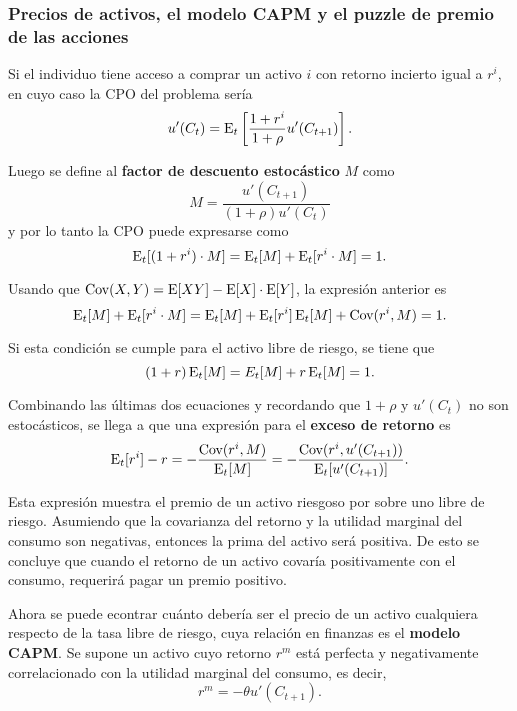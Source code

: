 \documentclass[DeGregorioResumen]{subfiles}
\begin{document}
\subsubsection{Precios de activos, el modelo CAPM y el puzzle de premio de las acciones}

Si el individuo tiene acceso a comprar un activo $i$ con retorno incierto igual a $r^i$, en cuyo caso la CPO del problema sería
\begin{equation*}
u'(C_t)= \operatorname{E}_t \left[\frac{1+r^i}{1+\rho} u'(C_{t+1}) \right].
\end{equation*}

Luego se define al \textbf{factor de descuento estocástico} $M$ como
\begin{equation}
M= \frac{u'(C_{t+1})}{(1+\rho)u'(C_t)}
\end{equation}
y por lo tanto la CPO puede expresarse como
\begin{equation*}
\operatorname{E}_t[(1+r^i)\cdot M] = \operatorname{E}_t[M] + \operatorname{E}_t[r^i\cdot M]=1.
\end{equation*}

Usando que $\text{Cov}(X,Y)=\operatorname{E}[XY]-\operatorname{E}[X]\cdot \operatorname{E}[Y] $, la expresión anterior es
\begin{equation*}
\operatorname{E}_t[M]+\operatorname{E}_t[r^i\cdot M] = \operatorname{E}_t[M] + \operatorname{E}_t[r^i]\operatorname{E}_t[M]+ \text{Cov}(r^i, M) = 1.
\end{equation*}

Si esta condición se cumple para el activo libre de riesgo, se tiene que
\begin{equation*}
(1+r)\operatorname{E}_t[M] = E_t[M]+r\operatorname{E}_t[M]=1.
\end{equation*}

Combinando las últimas dos ecuaciones y recordando que $1+\rho$ y $u'(C_t)$ no son estocásticos, se llega a que una expresión para el \textbf{exceso de retorno} es
\begin{equation}
\operatorname{E}_t[r^i]-r = -\frac{\text{Cov}(r^i,M)}{\operatorname{E}_t[M]} = -\frac{\text{Cov}(r^i,u'(C_{t+1}))}{\operatorname{E}_t[u'(C_{t+1})]}.
\label{eq:exceso_retorno}
\end{equation}

Esta expresión muestra el premio de un activo riesgoso por sobre uno libre de riesgo. Asumiendo que la covarianza del retorno y la utilidad marginal del consumo son negativas, entonces la prima del activo será positiva. De esto se concluye que cuando el retorno de un activo covaría positivamente con el consumo, requerirá pagar un premio positivo.

Ahora se puede econtrar cuánto debería ser el precio de un activo cualquiera respecto de la tasa libre de riesgo, cuya relación en finanzas es el \textbf{modelo CAPM}. Se supone un activo cuyo retorno $r^m$ está perfecta y negativamente correlacionado con la utilidad marginal del consumo, es decir,
\[
r^m = -\theta u' (C_{t+1}).
\]
\end{document}
